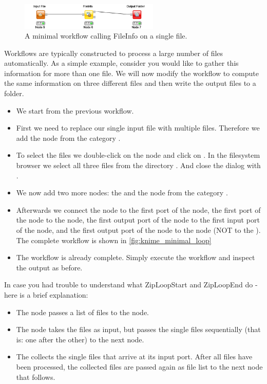 \begin{figure}
\centering
\includegraphics[width=0.59\textwidth]{graphics/knime_setup/Minimal_FileInfo}
\caption{A minimal workflow calling FileInfo on a single file.}
\label{fig:knime_minimal}
\end{figure}


Workflows are typically constructed to process a large number of files automatically.
As a simple example, consider you would like to gather this information for more than one file.
We will now modify the workflow to compute the same information on three different files and then write the output files to a folder.

\begin{itemize}
\item
We start from the previous workflow.
\item
First we need to replace our single input file with multiple files.
Therefore we add the  node from the category .
\item
To select the files we double-click on the  node and click on .
In the filesystem browser we select all three files from the directory .
And close the dialog with .
\item
We now add two more nodes: the  and the  node from the category . 
\item
Afterwards we connect the  node to the first port of the  node, the first port of the  node to the  node, the first output port of the  node to the first input port of the  node, and the first output port of the  node to the  node (NOT to the ).
The complete workflow is shown in \cref{fig:knime_minimal_loop}
\item
The workflow is already complete.
Simply execute the workflow and inspect the output as before.
\end{itemize}

In case you had trouble to understand what ZipLoopStart and ZipLoopEnd do - here is a brief explanation:
\begin{itemize}
\item
The   node passes a list of files to the  node.
\item
The  node takes the files as input, but passes the single files sequentially (that is: one after the other) to the next node. 
\item
The  collects the single files that arrive at its input port. After all files have been processed, the collected files are passed again as file list to the next node that follows.
\end{itemize}


